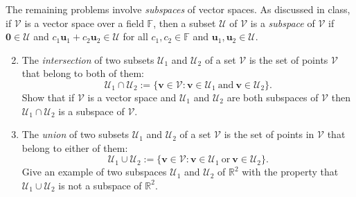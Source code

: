 \documentclass[12pt]{amsart}
\newcommand{\1}{\mathbbm{1}}
\numberwithin{equation}{section}
\numberwithin{Theorem}{section}
\theoremstyle{plain} %
\theoremstyle{definition}
\theoremstyle{remark}
\begin{document}
The remaining problems involve \textit{subspaces} of vector spaces.
As discussed in class, if $\mathcal{V}$ is a vector space over a field $\mathbb{F}$,
then a subset $\mathcal{U}$ of $\mathcal{V}$ is a \textit{subspace} of $\mathcal{V}$ if $\mathbf{0}\in\mathcal{U}$ and $c_1\mathbf{u}_1+c_2\mathbf{u}_2\in\mathcal{U}$ for all $c_1,c_2\in\mathbb{F}$ and $\mathbf{u}_1,\mathbf{u}_2\in\mathcal{U}$.\bigskip

\begin{enumerate}[1.]
\setcounter{enumi}{1}
\item
The \textit{intersection} of two subsets $\mathcal{U}_1$ and $\mathcal{U}_2$ of a set $\mathcal{V}$ is the set of points $\mathcal{V}$ that belong to both of them:
\begin{equation*}
\mathcal{U}_1\cap\mathcal{U}_2:=\{\mathbf{v}\in\mathcal{V}: \mathbf{v}\in\mathcal{U}_1\ \text{and}\ \mathbf{v}\in\mathcal{U}_2\}.
\end{equation*}
Show that if $\mathcal{V}$ is a vector space and $\mathcal{U}_1$ and $\mathcal{U}_2$ are both subspaces of $\mathcal{V}$ then $\mathcal{U}_1\cap\mathcal{U}_2$ is a subspace of $\mathcal{V}$.\bigskip

\item
The \textit{union} of two subsets $\mathcal{U}_1$ and $\mathcal{U}_2$ of a set $\mathcal{V}$ is the set of points in $\mathcal{V}$ that belong to either of them:
\begin{equation*}
\mathcal{U}_1\cup\mathcal{U}_2:=\{\mathbf{v}\in\mathcal{V}: \mathbf{v}\in\mathcal{U}_1\ \text{or}\ \mathbf{v}\in\mathcal{U}_2\}.
\end{equation*}
Give an example of two subspaces $\mathcal{U}_1$ and $\mathcal{U}_2$ of $\mathbb{R}^2$ with the property that $\mathcal{U}_1\cup\mathcal{U}_2$ is not a subspace of $\mathbb{R}^2$.\bigskip


\end{enumerate}
\end{document}
